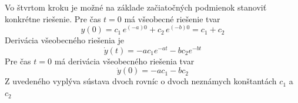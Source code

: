 \documentclass[a4paper, 10pt, ]{article}
\begin{document}
\begin{itemize}[leftmargin=0pt, labelsep=3mm, itemsep=0pt]
    Vo štvrtom kroku je možné na základe začiatočných podmienok stanoviť konkrétne riešenie. Pre čas $t = 0$ má všeobecné riešenie tvar
    \begin{equation}
        y(0)  = c_1 \, e^{(-a) 0} + c_2 \, e^{(-b) 0} = c_1 + c_2   
    \end{equation}
    Derivácia všeobecného riešenia je
    \begin{equation}
        \dot y(t) = -a c_1 e^{-at} - b c_2 e^{-bt}
    \end{equation}
    Pre čas $t = 0$ má derivácia všeobecného riešenia tvar
    \begin{equation}
        \dot y(0)  = -a c_1 - b c_2
    \end{equation}
    Z uvedeného vyplýva sústava dvoch rovníc o dvoch neznámych konštantách $c_1$ a $c_2$









   





\end{itemize}
\end{document}
